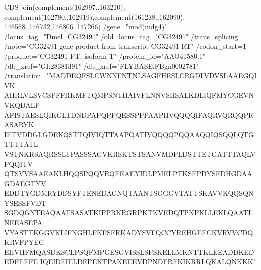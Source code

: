 \documentclass{article}
\begin{document}
\begin{Schunk}
\begin{Soutput}
     CDS             join(complement(162997..163210),
                     complement(162780..162919),complement(161238..162090),
                     146568..146732,146806..147266)
                     /gene="mod(mdg4)"
                     /locus_tag="Dmel_CG32491"
                     /old_locus_tag="CG32491"
                     /trans_splicing
                     /note="CG32491 gene product from transcript CG32491-RT"
                     /codon_start=1
                     /product="CG32491-PT, isoform T"
                     /protein_id="AAO41580.1"
                     /db_xref="GI:28381391"
                     /db_xref="FLYBASE:FBgn0002781"
                     /translation="MADDEQFSLCWNNFNTNLSAGFHESLCRGDLVDVSLAAEGQIVK
                     AHRLVLSVCSPFFRKMFTQMPSNTHAIVFLNNVSHSALKDLIQFMYCGEVNVKQDALP
                     AFISTAESLQIKGLTDNDPAPQPPQESSPPPAAPHVQQQQIPAQRVQRQQPRASARYK
                     IETVDDGLGDEKQSTTQIVIQTTAAPQATIVQQQQPQQAAQQIQSQQLQTGTTTTATL
                     VSTNKRSAQRSSLTPASSSAGVKRSKTSTSANVMDPLDSTTETGATTTAQLVPQQITV
                     QTSVVSAAEAKLHQQSPQQVRQEEAEYIDLPMELPTKSEPDYSEDHGDAAGDAEGTYV
                     EDDTYGDMRYDDSYFTENEDAGNQTAANTSGGGVTATTSKAVVKQQSQNYSESSFVDT
                     SGDQGNTEAQAATSASATKIPPRKRGRPKTKVEDQTPKPKLLEKLQAATLNEEASEPA
                     VYASTTKGGVKLIFNGHLFKFSFRKADYSVFQCCYREHGEECKVRVVCDQKRVFPYEG
                     EHVHFMQASDKSCLPSQFMPGESGVISSLSPSKELLMKNTTKLEEADDKEDEDFEEFE
                     IQEIDEIELDEPEKTPAKEEEVDPNDFREKIKRRLQKALQNKKK"
\end{Soutput}
\end{Schunk}

\end{document}
